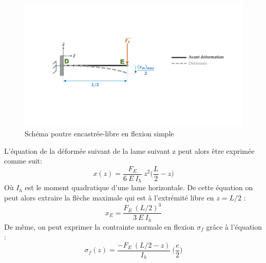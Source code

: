 \begin{figure}[!htbp]
\begin{center}
    \captionsetup{justification=centering}
	\includegraphics[trim={4cm 5.5cm 2.9cm 5cm},clip, width=\textwidth]{../Chap3/Figure/poutre_flexion_simple.pdf}
	\caption{Schéma poutre encastrée-libre en flexion simple}
	\label{fig:poutre_flexion_simple}
\end{center}
\end{figure}
L'équation de la déformée suivant de la lame suivant z peut alors être exprimée comme suit:
\begin{equation}
		x(z) = \frac{F_E}{6\ E\ I_h}\ z^2 \biggl( \frac{L}{2} - z \biggr)
\label{eq:deformée_encastrée-libre}
\end{equation} 
Où $I_h$ est le moment quadratique d'une lame horizontale. De cette équation on peut alors extraire la flèche maximale qui est à l'extrémité libre en $z=L/2$ :
\begin{equation}
		x_E = \frac{F_E\ (L/2)^3}{3\ E\ I_h}
\label{eq:fleche_encastrée-libre}
\end{equation} 	
De même, on peut exprimer la contrainte normale en flexion $\sigma _f$ grâce à l'équation :
\begin{equation}
	\sigma _f(z) = \frac{-F_E\ (L/2 - z)}{I_h}\ \biggl( \frac{e}{2} \biggr)
\end{equation}

